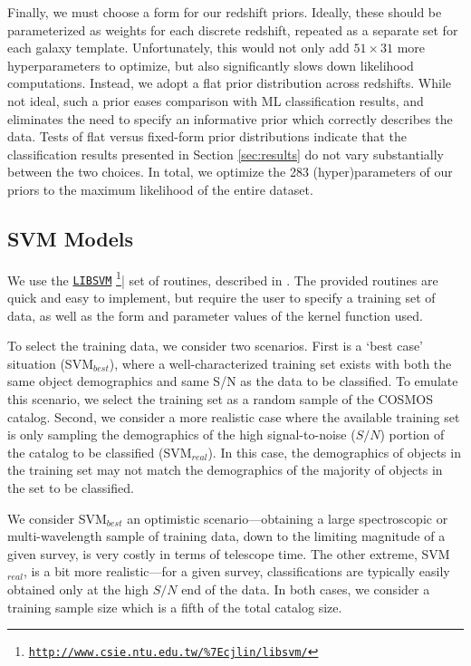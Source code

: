 \documentclass[12pt,preprint]{aastex}
\begin{document}
Finally, we must choose a form for our redshift priors.  Ideally,
these should be parameterized as weights for each discrete redshift,
repeated as a separate set for each galaxy template.  Unfortunately,
this would not only add $51\times31$ more hyperparameters to optimize,
but also significantly slows down likelihood computations.  Instead,
we adopt a flat prior distribution across redshifts.  While not ideal,
such a prior eases comparison with ML classification results, and
eliminates the need to specify an informative prior which correctly
describes the data.  Tests of flat versus fixed-form prior
distributions indicate that the classification results presented in
Section \ref{sec:results} do not vary substantially between the two
choices.  In total, we optimize the 283 (hyper)parameters of our
priors to the maximum likelihood of the entire dataset.

\subsection{SVM Models}

We use the \href{http://www.csie.ntu.edu.tw/\%7Ecjlin/libsvm/}{\texttt{LIBSVM}}
\footnote{\href{http://www.csie.ntu.edu.tw/\%7Ecjlin/libsvm/}
{\tt http://www.csie.ntu.edu.tw/\%7Ecjlin/libsvm/}}| set of routines,
described in \citet{chang11a}.  The provided routines are quick and
easy to implement, but require the user to specify a training set of
data, as well as the form and parameter values of the kernel function
used.

To select the training data, we consider two scenarios.  First is a
`best case' situation (SVM$_{best}$), where a well-characterized
training set exists with both the same object demographics and same
S/N as the data to be classified.  To emulate this scenario, we select
the training set as a random sample of the COSMOS catalog.  Second, we
consider a more realistic case where the available training set is
only sampling the demographics of the high signal-to-noise ($S/N$)
portion of the catalog to be classified (SVM$_{real}$).  In this
case, the demographics of objects in the training set may not match
the demographics of the majority of objects in the set to be
classified.

We consider SVM$_{best}$ an optimistic scenario---obtaining a large
spectroscopic or multi-wavelength sample of training data, down to the
limiting magnitude of a given survey, is very costly in terms of
telescope time.  The other extreme, SVM$_{real}$, is a bit more
realistic---for a given survey, classifications are typically easily
obtained only at the high $S/N$ end of the data.  In both cases, we
consider a training sample size which is a fifth of the total catalog
size.
\end{document}
